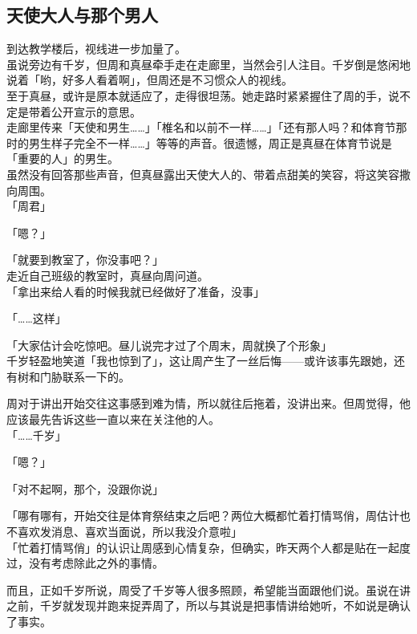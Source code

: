 \subsection{天使大人与那个男人}

到达教学楼后，视线进一步加量了。\\

虽说旁边有千岁，但周和真昼牵手走在走廊里，当然会引人注目。千岁倒是悠闲地说着「哟，好多人看着啊」，但周还是不习惯众人的视线。\\

至于真昼，或许是原本就适应了，走得很坦荡。她走路时紧紧握住了周的手，说不定是带着公开宣示的意思。\\

走廊里传来「天使和男生……」「椎名和以前不一样……」「还有那人吗？和体育节那时的男生样子完全不一样……」等等的声音。很遗憾，周正是真昼在体育节说是「重要的人」的男生。\\

虽然没有回答那些声音，但真昼露出天使大人的、带着点甜美的笑容，将这笑容撒向周围。\\

「周君」

「嗯？」

「就要到教室了，你没事吧？」\\

走近自己班级的教室时，真昼向周问道。\\

「拿出来给人看的时候我就已经做好了准备，没事」

「……这样」

「大家估计会吃惊吧。昼儿说完才过了个周末，周就换了个形象」\\

千岁轻盈地笑道「我也惊到了」，这让周产生了一丝后悔——或许该事先跟她，还有树和门胁联系一下的。

周对于讲出开始交往这事感到难为情，所以就往后拖着，没讲出来。但周觉得，他应该最先告诉这些一直以来在关注他的人。\\

「……千岁」

「嗯？」

「对不起啊，那个，没跟你说」

「哪有哪有，开始交往是体育祭结束之后吧？两位大概都忙着打情骂俏，周估计也不喜欢发消息、喜欢当面说，所以我没介意啦」\\

「忙着打情骂俏」的认识让周感到心情复杂，但确实，昨天两个人都是贴在一起度过，没有考虑除此之外的事情。

而且，正如千岁所说，周受了千岁等人很多照顾，希望能当面跟他们说。虽说在讲之前，千岁就发现并跑来捉弄周了，所以与其说是把事情讲给她听，不如说是确认了事实。\\


